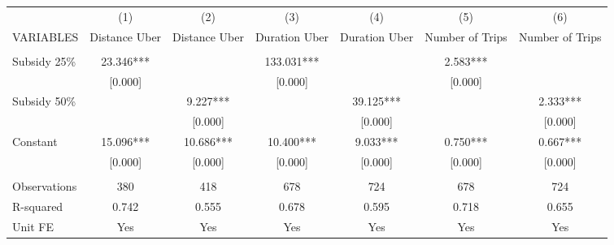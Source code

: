\begin{tabular}{lcccccc} \hline
 & (1) & (2) & (3) & (4) & (5) & (6) \\
VARIABLES & Distance Uber & Distance Uber & Duration Uber & Duration Uber & Number of Trips & Number of Trips \\ \hline
 &  &  &  &  &  &  \\
Subsidy 25\% & 23.346*** &  & 133.031*** &  & 2.583*** &  \\
 & [0.000] &  & [0.000] &  & [0.000] &  \\
Subsidy 50\% &  & 9.227*** &  & 39.125*** &  & 2.333*** \\
 &  & [0.000] &  & [0.000] &  & [0.000] \\
Constant & 15.096*** & 10.686*** & 10.400*** & 9.033*** & 0.750*** & 0.667*** \\
 & [0.000] & [0.000] & [0.000] & [0.000] & [0.000] & [0.000] \\
 &  &  &  &  &  &  \\
Observations & 380 & 418 & 678 & 724 & 678 & 724 \\
R-squared & 0.742 & 0.555 & 0.678 & 0.595 & 0.718 & 0.655 \\
 Unit FE & Yes & Yes & Yes & Yes & Yes & Yes \\ \hline
\end{tabular}
